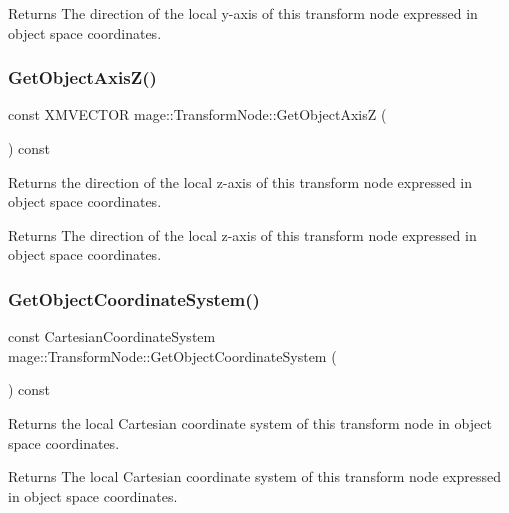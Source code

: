 \begin{DoxyReturn}{Returns}
The direction of the local y-\/axis of this transform node expressed in object space coordinates. 
\end{DoxyReturn}
\hypertarget{classmage_1_1_transform_node_a425c9ba06004d1de35ca97813524882a}{}\label{classmage_1_1_transform_node_a425c9ba06004d1de35ca97813524882a} 
\subsubsection{\texorpdfstring{Get\+Object\+Axis\+Z()}{GetObjectAxisZ()}}
{\footnotesize\ttfamily const X\+M\+V\+E\+C\+T\+OR mage\+::\+Transform\+Node\+::\+Get\+Object\+AxisZ (\begin{DoxyParamCaption}{ }\end{DoxyParamCaption}) const}

Returns the direction of the local z-\/axis of this transform node expressed in object space coordinates.

\begin{DoxyReturn}{Returns}
The direction of the local z-\/axis of this transform node expressed in object space coordinates. 
\end{DoxyReturn}
\hypertarget{classmage_1_1_transform_node_aa293ee88682b0d4ca6f5d7d6439595aa}{}\label{classmage_1_1_transform_node_aa293ee88682b0d4ca6f5d7d6439595aa} 
\subsubsection{\texorpdfstring{Get\+Object\+Coordinate\+System()}{GetObjectCoordinateSystem()}}
{\footnotesize\ttfamily const Cartesian\+Coordinate\+System mage\+::\+Transform\+Node\+::\+Get\+Object\+Coordinate\+System (\begin{DoxyParamCaption}{ }\end{DoxyParamCaption}) const}

Returns the local Cartesian coordinate system of this transform node in object space coordinates.

\begin{DoxyReturn}{Returns}
The local Cartesian coordinate system of this transform node expressed in object space coordinates. 
\end{DoxyReturn}
\hypertarget{classmage_1_1_transform_node_a1a3a2729e417697f0e3a1bb163ed9bb7}{}\label{classmage_1_1_transform_node_a1a3a2729e417697f0e3a1bb163ed9bb7} 
